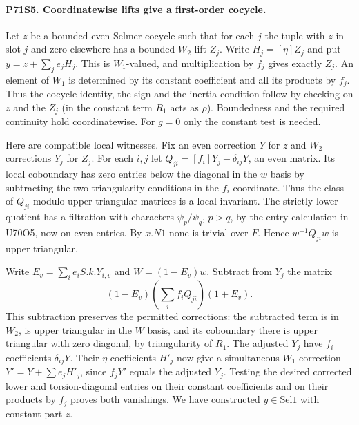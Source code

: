 \paragraph{P71S5. Coordinatewise lifts give a first-order cocycle.}
Let $z$ be a bounded even Selmer cocycle such that for each $j$
the tuple with $z$ in slot $j$ and zero elsewhere has a bounded
$W_2$-lift $Z_j$. Write $H_j=[\eta]Z_j$ and put
$y=z+\sum_j e_jH_j$. This is $W_1$-valued, and multiplication
by $f_j$ gives exactly $Z_j$. An element of $W_1$ is determined
by its constant coefficient and all its products by $f_j$.
Thus the cocycle identity, the sign and the inertia condition
follow by checking on $z$ and the $Z_j$ (in the constant term
$R_1$ acts as $\rho$). Boundedness and the required continuity
hold coordinatewise. For $g=0$ only the constant test is needed.

Here are compatible local witnesses. Fix an even correction $Y$
for $z$ and $W_2$ corrections $Y_j$ for $Z_j$. For each $i,j$
let $Q_{ji}=[f_i]Y_j-\delta_{ij}Y$, an even matrix. Its local
coboundary has zero entries below the diagonal in the $w$ basis
by subtracting the two triangularity conditions in the $f_i$
coordinate. Thus the class of $Q_{ji}$ modulo upper triangular
matrices is a local invariant. The strictly lower quotient has
a filtration with characters $\psi_p/\psi_q$, $p>q$, by the
entry calculation in U70O5, now on even entries. By $x.N1$ none
is trivial over $F$. Hence $w^{-1}Q_{ji}w$ is upper triangular.

Write $E_v=\sum_i e_i S.k.Y_{i,v}$ and
$W=(1-E_v)w$. Subtract from $Y_j$ the matrix
\[
    (1-E_v)\left(\sum_i f_i Q_{ji}\right)(1+E_v).
\]
This subtraction preserves the permitted corrections: the
subtracted term is in $W_2$, is upper triangular in the $W$
basis, and its coboundary there is upper triangular with zero
diagonal, by triangularity of $R_1$. The adjusted $Y_j$ have
$f_i$ coefficients $\delta_{ij}Y$. Their $\eta$ coefficients
$H'_j$ now give a simultaneous $W_1$ correction
$Y'=Y+\sum e_j H'_j$, since $f_jY'$ equals the adjusted $Y_j$.
Testing the desired corrected lower and torsion-diagonal entries
on their constant coefficients and on their products by $f_j$
proves both vanishings. We have constructed $y\in\mathrm{Sel1}$
with constant part $z$.

